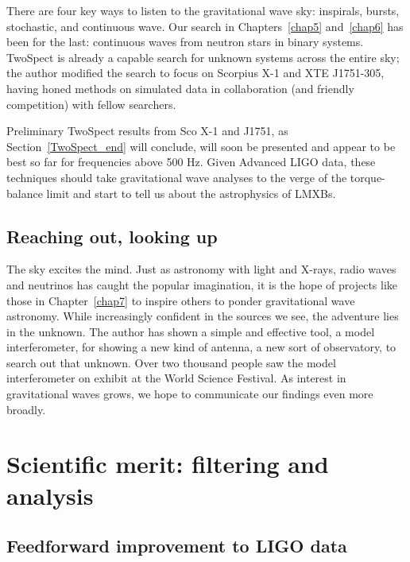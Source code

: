 There are four key ways to listen to the gravitational wave sky: inspirals, bursts, stochastic, and continuous wave.
Our search in Chapters~\ref{chap5} and~\ref{chap6} has been for the last: continuous waves from neutron stars in binary systems.
TwoSpect is already a capable search for unknown systems across the entire sky; the author modified the search to focus on Scorpius X-1 and XTE J1751-305, having honed methods on simulated data in collaboration (and friendly competition) with fellow searchers.

Preliminary TwoSpect results from Sco X-1 and J1751, as Section~\ref{TwoSpect_end} will conclude, will soon be presented and appear to be best so far for frequencies above 500 Hz.
Given Advanced LIGO data, these techniques should take gravitational wave analyses to the verge of the torque-balance limit and start to tell us about the astrophysics of LMXBs.

        \subsection{Reaching out, looking up}
        \label{reaching_out}

The sky excites the mind.
Just as astronomy with light and X-rays, radio waves and neutrinos has caught the popular imagination, it is the hope of projects like those in Chapter~\ref{chap7} to inspire others to ponder gravitational wave astronomy.
While increasingly confident in the sources we see, the adventure lies in the unknown.
The author has shown a simple and effective tool, a model interferometer, for showing a new kind of antenna, a new sort of observatory, to search out that unknown.
Over two thousand people saw the model interferometer on exhibit at the World Science Festival.
As interest in gravitational waves grows, we hope to communicate our findings even more broadly.

    \section{Scientific merit: filtering and analysis}
    \label{merit}


        \subsection{Feedforward improvement to LIGO data}
        \label{feedforward_end}

